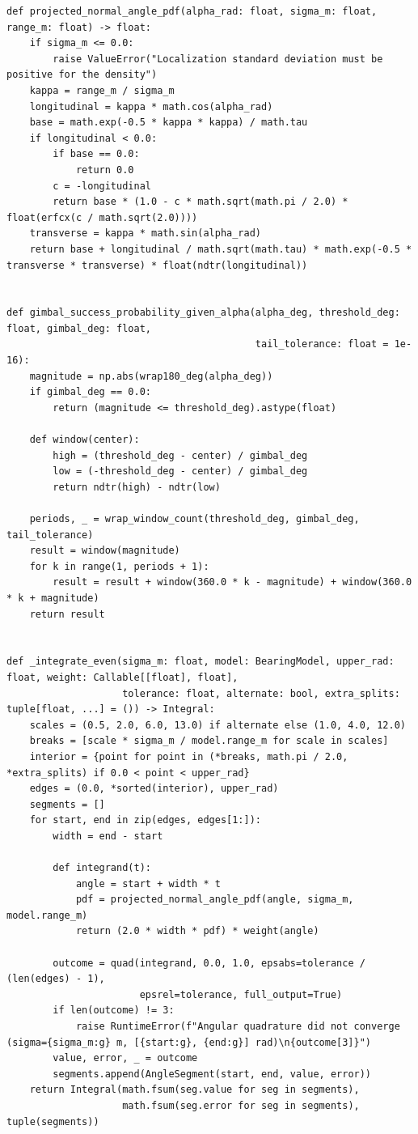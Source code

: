 \documentclass{swmcmthesis}
\begin{document}
\noindent{}
\begin{lstlisting}
def projected_normal_angle_pdf(alpha_rad: float, sigma_m: float, range_m: float) -> float:
    if sigma_m <= 0.0:
        raise ValueError("Localization standard deviation must be positive for the density")
    kappa = range_m / sigma_m
    longitudinal = kappa * math.cos(alpha_rad)
    base = math.exp(-0.5 * kappa * kappa) / math.tau
    if longitudinal < 0.0:
        if base == 0.0:
            return 0.0
        c = -longitudinal
        return base * (1.0 - c * math.sqrt(math.pi / 2.0) * float(erfcx(c / math.sqrt(2.0))))
    transverse = kappa * math.sin(alpha_rad)
    return base + longitudinal / math.sqrt(math.tau) * math.exp(-0.5 * transverse * transverse) * float(ndtr(longitudinal))


def gimbal_success_probability_given_alpha(alpha_deg, threshold_deg: float, gimbal_deg: float,
                                           tail_tolerance: float = 1e-16):
    magnitude = np.abs(wrap180_deg(alpha_deg))
    if gimbal_deg == 0.0:
        return (magnitude <= threshold_deg).astype(float)

    def window(center):
        high = (threshold_deg - center) / gimbal_deg
        low = (-threshold_deg - center) / gimbal_deg
        return ndtr(high) - ndtr(low)

    periods, _ = wrap_window_count(threshold_deg, gimbal_deg, tail_tolerance)
    result = window(magnitude)
    for k in range(1, periods + 1):
        result = result + window(360.0 * k - magnitude) + window(360.0 * k + magnitude)
    return result


def _integrate_even(sigma_m: float, model: BearingModel, upper_rad: float, weight: Callable[[float], float],
                    tolerance: float, alternate: bool, extra_splits: tuple[float, ...] = ()) -> Integral:
    scales = (0.5, 2.0, 6.0, 13.0) if alternate else (1.0, 4.0, 12.0)
    breaks = [scale * sigma_m / model.range_m for scale in scales]
    interior = {point for point in (*breaks, math.pi / 2.0, *extra_splits) if 0.0 < point < upper_rad}
    edges = (0.0, *sorted(interior), upper_rad)
    segments = []
    for start, end in zip(edges, edges[1:]):
        width = end - start

        def integrand(t):
            angle = start + width * t
            pdf = projected_normal_angle_pdf(angle, sigma_m, model.range_m)
            return (2.0 * width * pdf) * weight(angle)

        outcome = quad(integrand, 0.0, 1.0, epsabs=tolerance / (len(edges) - 1),
                       epsrel=tolerance, full_output=True)
        if len(outcome) != 3:
            raise RuntimeError(f"Angular quadrature did not converge (sigma={sigma_m:g} m, [{start:g}, {end:g}] rad)\n{outcome[3]}")
        value, error, _ = outcome
        segments.append(AngleSegment(start, end, value, error))
    return Integral(math.fsum(seg.value for seg in segments),
                    math.fsum(seg.error for seg in segments), tuple(segments))



\end{lstlisting}
\end{document}
